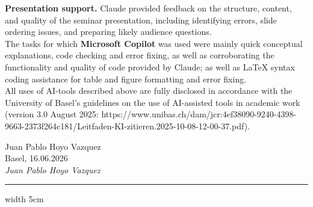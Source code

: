 \documentclass[12pt,a4paper,titlepage,oneside,english]{article}
\begin{document}
\textbf{Presentation support.} Claude provided feedback on the structure, content, and quality of the seminar presentation, including identifying errors, slide ordering issues, and preparing likely audience questions.\\
The tasks for which \textbf{Microsoft Copilot} was used were mainly quick conceptual explanations, code checking and error fixing, as well as corroborating the functionality and quality of code provided by Claude; as well as LaTeX syntax coding assistance for table and figure formatting and error fixing. \\
All uses of AI-tools described above are fully disclosed in accordance with the University of Basel's guidelines on the use of AI-assisted tools in academic work (version 3.0 August 2025: https://www.unibas.ch/dam/jcr:4ef38090-9240-4398-9663-2373f264c181/Leitfaden-KI-zitieren.2025-10-08-12-00-37.pdf).

Juan Pablo Hoyo Vazquez \\
Basel, 16.06.2026 \\
\textit{Juan Pablo Hoyo Vazquez}
\hrule width 5cm \relax

\end{document}
